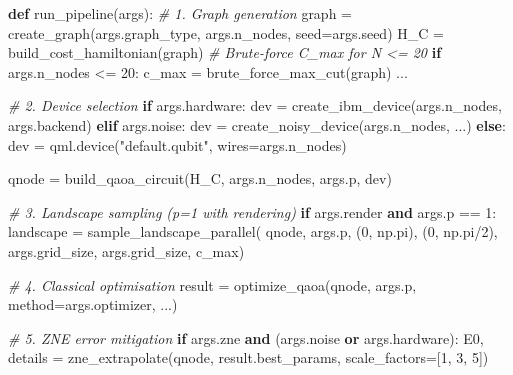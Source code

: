 \documentclass[
  11pt,
]{report}
\newenvironment{Shaded}{}{}
\newcommand{\CommentTok}[1]{\textcolor[rgb]{0.38,0.63,0.69}{\textit{#1}}}
\newcommand{\ControlFlowTok}[1]{\textcolor[rgb]{0.00,0.44,0.13}{\textbf{#1}}}
\newcommand{\DecValTok}[1]{\textcolor[rgb]{0.25,0.63,0.44}{#1}}
\newcommand{\KeywordTok}[1]{\textcolor[rgb]{0.00,0.44,0.13}{\textbf{#1}}}
\newcommand{\NormalTok}[1]{#1}
\newcommand{\OperatorTok}[1]{\textcolor[rgb]{0.40,0.40,0.40}{#1}}
\newcommand{\StringTok}[1]{\textcolor[rgb]{0.25,0.44,0.63}{#1}}
\begin{document}
\begin{Shaded}
\begin{Highlighting}[]
\KeywordTok{def}\NormalTok{ run\_pipeline(args):}
    \CommentTok{\# 1. Graph generation}
\NormalTok{    graph }\OperatorTok{=}\NormalTok{ create\_graph(args.graph\_type, args.n\_nodes, seed}\OperatorTok{=}\NormalTok{args.seed)}
\NormalTok{    H\_C }\OperatorTok{=}\NormalTok{ build\_cost\_hamiltonian(graph)}
    \CommentTok{\# Brute{-}force C\_max for N \textless{}= 20}
    \ControlFlowTok{if}\NormalTok{ args.n\_nodes }\OperatorTok{\textless{}=} \DecValTok{20}\NormalTok{:}
\NormalTok{        c\_max }\OperatorTok{=}\NormalTok{ brute\_force\_max\_cut(graph)}
\NormalTok{    ...}

    \CommentTok{\# 2. Device selection}
    \ControlFlowTok{if}\NormalTok{ args.hardware:}
\NormalTok{        dev }\OperatorTok{=}\NormalTok{ create\_ibm\_device(args.n\_nodes, args.backend)}
    \ControlFlowTok{elif}\NormalTok{ args.noise:}
\NormalTok{        dev }\OperatorTok{=}\NormalTok{ create\_noisy\_device(args.n\_nodes, ...)}
    \ControlFlowTok{else}\NormalTok{:}
\NormalTok{        dev }\OperatorTok{=}\NormalTok{ qml.device(}\StringTok{"default.qubit"}\NormalTok{, wires}\OperatorTok{=}\NormalTok{args.n\_nodes)}

\NormalTok{    qnode }\OperatorTok{=}\NormalTok{ build\_qaoa\_circuit(H\_C, args.n\_nodes, args.p, dev)}

    \CommentTok{\# 3. Landscape sampling (p=1 with rendering)}
    \ControlFlowTok{if}\NormalTok{ args.render }\KeywordTok{and}\NormalTok{ args.p }\OperatorTok{==} \DecValTok{1}\NormalTok{:}
\NormalTok{        landscape }\OperatorTok{=}\NormalTok{ sample\_landscape\_parallel(}
\NormalTok{            qnode, args.p, (}\DecValTok{0}\NormalTok{, np.pi), (}\DecValTok{0}\NormalTok{, np.pi}\OperatorTok{/}\DecValTok{2}\NormalTok{),}
\NormalTok{            args.grid\_size, args.grid\_size, c\_max)}

    \CommentTok{\# 4. Classical optimisation}
\NormalTok{    result }\OperatorTok{=}\NormalTok{ optimize\_qaoa(qnode, args.p, method}\OperatorTok{=}\NormalTok{args.optimizer, ...)}

    \CommentTok{\# 5. ZNE error mitigation}
    \ControlFlowTok{if}\NormalTok{ args.zne }\KeywordTok{and}\NormalTok{ (args.noise }\KeywordTok{or}\NormalTok{ args.hardware):}
\NormalTok{        E0, details }\OperatorTok{=}\NormalTok{ zne\_extrapolate(qnode, result.best\_params,}
\NormalTok{                                       scale\_factors}\OperatorTok{=}\NormalTok{[}\DecValTok{1}\NormalTok{, }\DecValTok{3}\NormalTok{, }\DecValTok{5}\NormalTok{])}


\end{Highlighting}
\end{Shaded}
\end{document}
